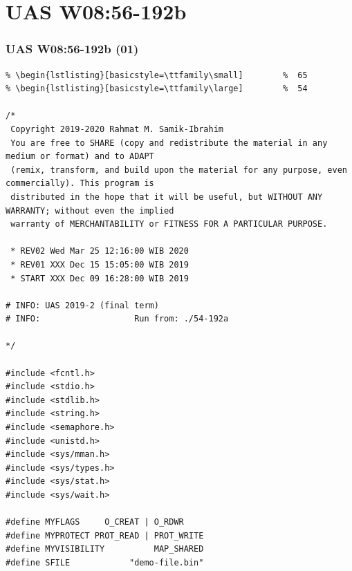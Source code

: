 \documentclass[aspectratio=169, xcolor=table, notheorems, hyperref={pdfpagelabels=false}]{beamer}
\begin{document}
\section{UAS W08:56-192b}
\begin{frame}[fragile]
\frametitle{UAS W08:56-192b (01)}
\begin{lstlisting}[basicstyle=\ttfamily\tiny]         % 108
% \begin{lstlisting}[basicstyle=\ttfamily\footnotesize] %  72
% \begin{lstlisting}[basicstyle=\ttfamily\small]        %  65
% \begin{lstlisting}[basicstyle=\ttfamily\large]        %  54

/*
 Copyright 2019-2020 Rahmat M. Samik-Ibrahim
 You are free to SHARE (copy and redistribute the material in any medium or format) and to ADAPT
 (remix, transform, and build upon the material for any purpose, even commercially). This program is
 distributed in the hope that it will be useful, but WITHOUT ANY WARRANTY; without even the implied 
 warranty of MERCHANTABILITY or FITNESS FOR A PARTICULAR PURPOSE.

 * REV02 Wed Mar 25 12:16:00 WIB 2020
 * REV01 XXX Dec 15 15:05:00 WIB 2019
 * START XXX Dec 09 16:28:00 WIB 2019

# INFO: UAS 2019-2 (final term)
# INFO:                   Run from: ./54-192a

*/

#include <fcntl.h>
#include <stdio.h>
#include <stdlib.h>
#include <string.h>
#include <semaphore.h>
#include <unistd.h>
#include <sys/mman.h>
#include <sys/types.h>
#include <sys/stat.h>
#include <sys/wait.h>

#define MYFLAGS     O_CREAT | O_RDWR
#define MYPROTECT PROT_READ | PROT_WRITE
#define MYVISIBILITY          MAP_SHARED
#define SFILE            "demo-file.bin"

\end{lstlisting}
\end{frame}
\end{document}
